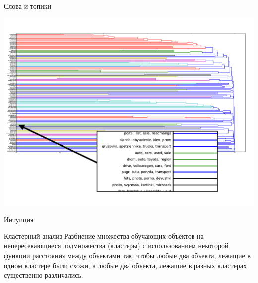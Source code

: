 \documentclass[10pt,a4paper]{beamer}
\begin{document}

\begin{frame}{Слова и топики}

\begin{center}
\includegraphics[scale=0.27]{images/hier.png}
\end{center}

\end{frame}


\begin{frame}{Интуиция}

\begin{exampleblock}{Кластерный анализ}
Разбиение множества обучающих объектов на непересекающиеся подмножества (кластеры) с использованием некоторой функции расстояния между объектами так, чтобы любые два объекта, лежащие в одном кластере были схожи, а любые два объекта, лежащие в разных кластерах существенно различались.
\end{exampleblock}

\end{frame}

\end{document}
